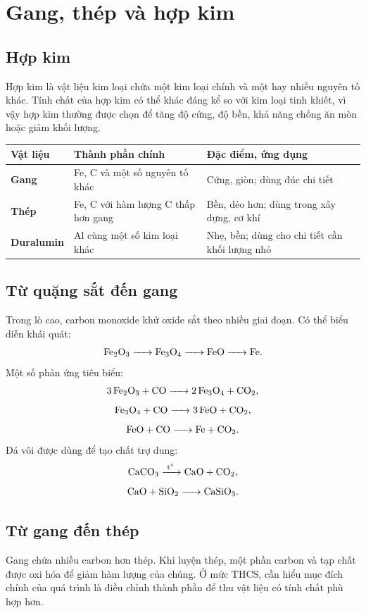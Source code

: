 \section{Gang, thép và hợp kim}

\subsection{Hợp kim}

Hợp kim là vật liệu kim loại chứa một kim loại chính và một hay nhiều nguyên tố khác. Tính chất của hợp kim có thể khác đáng kể so với kim loại tinh khiết, vì vậy hợp kim thường được chọn để tăng độ cứng, độ bền, khả năng chống ăn mòn hoặc giảm khối lượng.

\begin{center}
\begin{tabularx}{0.96\textwidth}{>{\bfseries}C{2.7cm}YY}
\toprule
Vật liệu & Thành phần chính & Đặc điểm, ứng dụng \\
\midrule
Gang & Fe, C và một số nguyên tố khác & Cứng, giòn; dùng đúc chi tiết \\
Thép & Fe, C với hàm lượng C thấp hơn gang & Bền, dẻo hơn; dùng trong xây dựng, cơ khí \\
Duralumin & Al cùng một số kim loại khác & Nhẹ, bền; dùng cho chi tiết cần khối lượng nhỏ \\
\bottomrule
\end{tabularx}
\end{center}

\subsection{Từ quặng sắt đến gang}

Trong lò cao, carbon monoxide khử oxide sắt theo nhiều giai đoạn. Có thể biểu diễn khái quát:
\[
\ce{Fe2O3 -> Fe3O4 -> FeO -> Fe}.
\]
Một số phản ứng tiêu biểu:
\[
\ce{3Fe2O3 + CO -> 2Fe3O4 + CO2},
\]
\[
\ce{Fe3O4 + CO -> 3FeO + CO2},
\]
\[
\ce{FeO + CO -> Fe + CO2}.
\]
Đá vôi được dùng để tạo chất trợ dung:
\[
\ce{CaCO3 ->[t^\circ] CaO + CO2},
\]
\[
\ce{CaO + SiO2 -> CaSiO3}.
\]

\subsection{Từ gang đến thép}

Gang chứa nhiều carbon hơn thép. Khi luyện thép, một phần carbon và tạp chất được oxi hóa để giảm hàm lượng của chúng. Ở mức THCS, cần hiểu mục đích chính của quá trình là điều chỉnh thành phần để thu vật liệu có tính chất phù hợp hơn.

